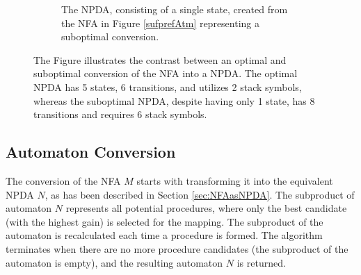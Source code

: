 \begin{figure}[!h]
\begin{subfigure}[b]{0.485\textwidth}
                \caption*{The NPDA, consisting of a single state, created from the NFA in Figure \ref{sufprefAtm} representing a suboptimal conversion.}
            \end{subfigure}
            \vspace*{1em}
            \caption{The Figure illustrates the contrast between an optimal and suboptimal conversion of the NFA into a NPDA. The optimal NPDA has 5 states, 6 transitions, and utilizes 2 stack symbols, whereas the suboptimal NPDA, despite having only 1 state, has 8 transitions and requires 6 stack symbols.}
            \label{fig:optimal_red}
        \end{figure}

    \subsection{Automaton Conversion}
        The conversion of the NFA $M$ starts with transforming it into the equivalent NPDA $N$, as has been described in Section \ref{sec:NFAasNPDA}. The subproduct of automaton $N$ represents all potential procedures, where only the best candidate (with the highest gain) is selected for the mapping. The subproduct of the automaton is recalculated each time a procedure is formed. The algorithm terminates when there are no more procedure candidates (the subproduct of the automaton is empty), and the resulting automaton $N$ is returned.

